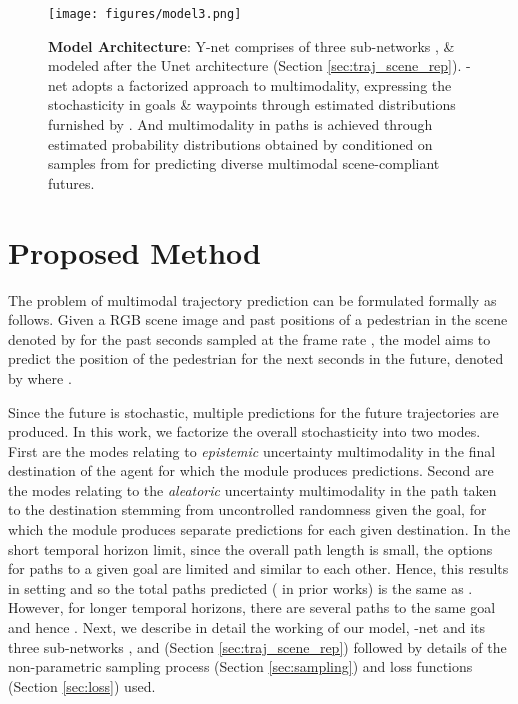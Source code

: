 \documentclass[final]{cvpr}
\begin{document}
\begin{figure*}[t!]
\begin{center}
\texttt{[image: figures/model3.png]}
\end{center}

  \caption{\textbf{Model Architecture}: \textsf{Y}-net comprises of three sub-networks ,  \&  modeled after the Unet architecture \cite{unet} (Section \ref{sec:traj_scene_rep}). -net adopts a factorized approach to multimodality, expressing the stochasticity in goals \& waypoints through estimated distributions furnished by . And multimodality in paths is achieved through estimated probability distributions obtained by  conditioned on samples from  for predicting diverse multimodal scene-compliant futures.}
  
\label{fig:arch}
\end{figure*}

\section{Proposed Method}
The problem of multimodal trajectory prediction can be formulated formally as follows. Given a RGB scene image  and past positions of a pedestrian in the scene  denoted by  for the past  seconds sampled at the frame rate , the model aims to predict the position of the pedestrian for the next  seconds in the future, denoted by  where . 

Since the future is stochastic, multiple predictions for the future trajectories are produced. In this work, we factorize the overall stochasticity into two modes. First are the modes relating to \textit{epistemic} uncertainty \ie multimodality in the final destination of the agent for which the module produces  predictions. Second are the modes relating to the \textit{aleatoric} uncertainty \ie multimodality in the path taken to the destination stemming from uncontrolled randomness given the goal, for which the module produces  separate predictions for each given destination. In the short temporal horizon limit, since the overall path length is small, the options for paths to a given goal are limited and similar to each other. Hence, this results in setting  and so the total paths predicted ( in prior works) is the same as . However, for longer temporal horizons, there are several paths to the same goal and hence . Next, we describe in detail the working of our model, -net and its three sub-networks ,  and  (Section \ref{sec:traj_scene_rep}) followed by details of the non-parametric sampling process (Section \ref{sec:sampling}) and loss functions (Section \ref{sec:loss}) used.
\end{document}
